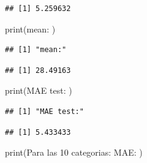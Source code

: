 \documentclass[
]{article}
\newenvironment{Shaded}{\begin{snugshade}}{\end{snugshade}}
\newcommand{\FunctionTok}[1]{\textcolor[rgb]{0.00,0.00,0.00}{#1}}
\newcommand{\NormalTok}[1]{#1}
\newcommand{\SpecialCharTok}[1]{\textcolor[rgb]{0.00,0.00,0.00}{#1}}
\newcommand{\StringTok}[1]{\textcolor[rgb]{0.31,0.60,0.02}{#1}}
\begin{document}
\begin{verbatim}
## [1] 5.259632
\end{verbatim}

\begin{Shaded}
\begin{Highlighting}[]
\FunctionTok{print}\NormalTok{(}\StringTok{\textquotesingle{}mean:\textquotesingle{}}\NormalTok{ )}
\end{Highlighting}
\end{Shaded}

\begin{verbatim}
## [1] "mean:"
\end{verbatim}

\begin{Shaded}
\end{Shaded}

\begin{verbatim}
## [1] 28.49163
\end{verbatim}

\begin{Shaded}
\begin{Highlighting}[]
\FunctionTok{print}\NormalTok{(}\StringTok{\textquotesingle{}MAE test:\textquotesingle{}}\NormalTok{ )}
\end{Highlighting}
\end{Shaded}

\begin{verbatim}
## [1] "MAE test:"
\end{verbatim}

\begin{Shaded}
\end{Shaded}

\begin{verbatim}
## [1] 5.433433
\end{verbatim}

\begin{Shaded}
\begin{Highlighting}[]
\FunctionTok{print}\NormalTok{(}\StringTok{\textquotesingle{}Para las 10 categorias: MAE:\textquotesingle{}}\NormalTok{ )}
\end{Highlighting}
\end{Shaded}
\end{document}
